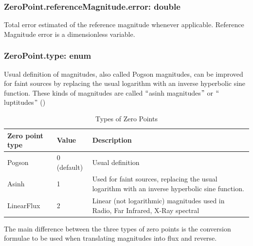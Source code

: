 \documentclass[11pt,a4paper]{ivoa}
\begin{document}
\subsubsection{ZeroPoint.referenceMagnitude.error: double}
Total error estimated of the reference magnitude whenever applicable. Reference 
Magnitude error is a dimensionless variable.\par

\subsubsection{ZeroPoint.type: enum}
Usual definition of magnitudes, also called Pogson magnitudes, can be improved 
for faint sources by replacing the usual logarithm with an inverse hyperbolic 
sine function. These kinds of magnitudes are called $``$asinh magnitudes$"$  
or $``$luptitudes$"$  (\citep{2004A&A...422..205G})\par



\begin{table}[ht]
 			\centering
\begin{tabular}{p{2.42in}p{0.8in}p{1.55in}}
\hline
\multicolumn{1}{|p{2.42in}}{Zero point type} &
\multicolumn{1}{|p{0.8in}}{Value} &
\multicolumn{1}{|p{1.55in}|}{Description} \\
\hline
\multicolumn{1}{|p{2.42in}}{Pogson} &
\multicolumn{1}{|p{0.8in}}{0 (default)} &
\multicolumn{1}{|p{1.55in}|}{Usual definition} \\
\hline
\multicolumn{1}{|p{2.42in}}{Asinh} &
\multicolumn{1}{|p{0.8in}}{1} &
\multicolumn{1}{|p{1.55in}|}{Used for faint sources, replacing the usual 
logarithm with an inverse hyperbolic sine function.} \\
\hline
\multicolumn{1}{|p{2.42in}}{LinearFlux} &
\multicolumn{1}{|p{0.8in}}{2} &
\multicolumn{1}{|p{1.55in}|}{Linear (not logarithmic) magnitudes used in 
Radio, Far Infrared, X-Ray spectral } \\
\hline
\end{tabular}
\caption{Types of Zero Points}
 \end{table}



The main difference between the three types of zero points is the 
conversion formulae to be used when translating magnitudes into flux and 
reverse.\par
\end{document}
